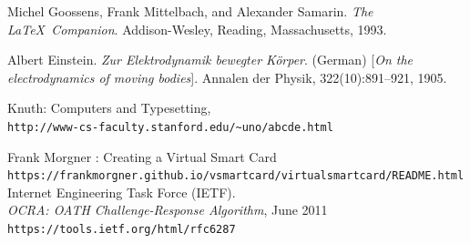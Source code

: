 \documentclass[bsc,frontabs,twoside,singlespacing,parskip,deptreport]{infthesis}     %
\begin{document}

%
\begin{thebibliography}{}

Michel Goossens, Frank Mittelbach, and Alexander Samarin. 
\textit{The \LaTeX\ Companion}. 
Addison-Wesley, Reading, Massachusetts, 1993.
 
Albert Einstein. 
\textit{Zur Elektrodynamik bewegter K{\"o}rper}. (German) 
[\textit{On the electrodynamics of moving bodies}]. 
Annalen der Physik, 322(10):891–921, 1905.
 
Knuth: Computers and Typesetting,
\\\texttt{http://www-cs-faculty.stanford.edu/\~{}uno/abcde.html}

Frank Morgner : Creating a Virtual Smart Card\\
\texttt{https://frankmorgner.github.io/vsmartcard/virtualsmartcard/README.html}\\

Internet Engineering Task Force (IETF).\\
\textit{OCRA: OATH Challenge-Response Algorithm}, June 2011\\
\texttt{https://tools.ietf.org/html/rfc6287}


\end{thebibliography}

\end{document}

